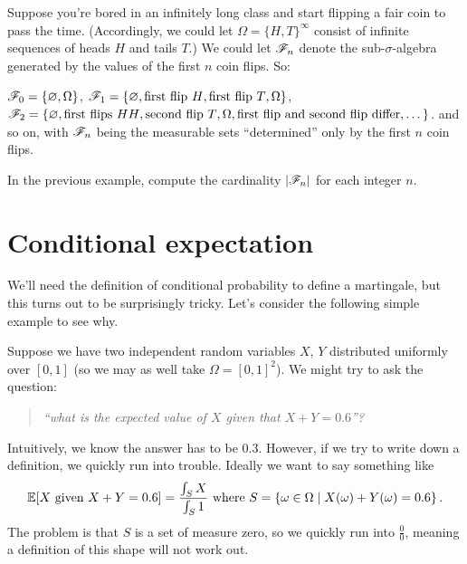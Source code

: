 \begin{example}
	[Filtration]
	Suppose you're bored in an infinitely long class
	and start flipping a fair coin to pass the time.
	(Accordingly, we could let $\Omega = \{H,T\}^\infty$
	consist of infinite sequences of heads $H$ and tails $T$.)
	We could let $\mathscr F_n$ denote the sub-$\sigma$-algebra
	generated by the values of the first $n$ coin flips.
	So:
	\begin{itemize}
		\ii $\mathscr F_0 = \{\varnothing, \Omega\}$,
		\ii $\mathscr F_1 = \{\varnothing, \text{first flip $H$}, \text{first flip $T$}, \Omega\}$,
		\ii $\mathscr F_2 = \{\varnothing, \text{first flips $HH$}, \text{second flip $T$}, \Omega, \text{first flip and second flip differ}, \dots\}$.
		\ii and so on, with $\mathscr F_n$ being the measurable sets
		``determined'' only by the first $n$ coin flips.
	\end{itemize}
\end{example}

\begin{exercise}
	In the previous example, compute the cardinality $|\mathscr F_n|$ for each integer $n$.
\end{exercise}

\section{Conditional expectation}

We'll need the definition of conditional probability to define a martingale,
but this turns out to be surprisingly tricky.
Let's consider the following simple example to see why.
\begin{example}
	Suppose we have two independent random variables $X$, $Y$ distributed
	uniformly over $[0,1]$ (so we may as well take $\Omega = [0,1]^2$).
	We might try to ask the question:
	\begin{quote}
		\itshape
		``what is the expected value of $X$
		given that $X+Y = 0.6$''?
	\end{quote}
	Intuitively, we know the answer has to be $0.3$.
	However, if we try to write down a definition, we quickly run into trouble.
	Ideally we want to say something like
	\[ \mathbb E[X \text{ given } X+Y=0.6]
		= \frac{\int_{S} X}{\int_{S} 1}
		\text{ where }
		S = \left\{ \omega \in \Omega \mid X(\omega)+Y(\omega)=0.6 \right\}.  \]
	The problem is that $S$ is a set of measure zero,
	so we quickly run into $\frac 00$, meaning a definition
	of this shape will not work out.
\end{example}

